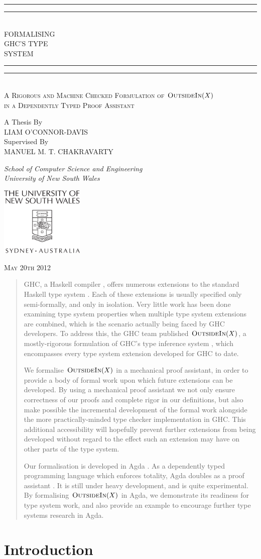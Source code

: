 \documentclass[a4paper]{jfp}
\newlength{\tpheight}\setlength{\tpheight}{0.9\textheight}
\newlength{\txtheight}\setlength{\txtheight}{0.9\tpheight}
\newlength{\tpwidth}\setlength{\tpwidth}{0.9\textwidth}
\newlength{\txtwidth}\setlength{\txtwidth}{0.9\tpwidth}
\newlength{\drop}
\newcommand{\outsidein}{\textsc{OutsideIn}(X)}
\newcommand*{\titleGP}{\begingroup%

\drop=0.1\txtheight
\centering
\vspace*{\baselineskip}
\rule{\txtwidth}{1.6pt}\vspace*{-\baselineskip}\vspace*{2pt}
\rule{\txtwidth}{0.4pt}\\[\baselineskip]
{\LARGE FORMALISING\\ GHC'S TYPE \\[0.3\baselineskip] SYSTEM}\\[0.2\baselineskip]
\rule{\txtwidth}{0.4pt}\vspace*{-\baselineskip}\vspace{3.2pt}
\rule{\txtwidth}{1.6pt}\\[\baselineskip]
\scshape
A Rigorous and Machine Checked Formulation of $\textsc{OutsideIn}(X)$ \\
in a Dependently Typed Proof Assistant \\
\par
\vspace*{2\baselineskip}
A Thesis By \\[\baselineskip]
{\Large LIAM O'CONNOR-DAVIS}
 \\[\baselineskip]
Supervised By \\[\baselineskip]
{\Large MANUEL M. T. CHAKRAVARTY}
 \\[\baselineskip]
{\itshape School of Computer Science and Engineering \\ University of New South Wales \par}
\vfill
\includegraphics[width=4cm]{unswcrest.pdf} \\

\medskip

{\scshape May 20th 2012} \\
\par
\endgroup}
\begin{document}
\setlength{\parskip}{9pt plus 1pt minus 1pt}
\pagestyle{empty}
\titleGP
\clearpage
\pagestyle{plain}
\begin{abstract}

GHC, a Haskell compiler \cite{Anonymous:2010we}, offers numerous extensions to the standard Haskell type system \cite{Schrijvers:2009jg,
   Yorgey:2012:GHP:2103786.2103795, citeulike:9320233, Jones:2007dr}.  Each of these extensions is usually specified only semi-formally, and only in
isolation. Very little work has been done examining type system properties when multiple type system extensions are combined, which is the scenario
actually being faced by GHC developers. To address this, the GHC team published $\outsidein$, a mostly-rigorous formulation of GHC's type inference
system \cite{Vytiniotis:2011:OMT:2139531.2139533}, which encompasses every type system extension developed for GHC to date. 

We formalise $\outsidein$ in a mechanical proof assistant, in order to provide a body of formal work upon which future extensions can be developed. By
using a mechanical proof assistant we not only ensure correctness of our proofs and complete rigor in our definitions, but also make possible the
incremental development of the formal work alongside the more practically-minded type checker implementation in GHC\@. This additional accessibility
will hopefully prevent further extensions from being developed without regard to the effect such an extension may have on other parts of the type
system.

Our formalisation is developed in Agda \cite{conf/afp/norell08}. As a dependently typed programming language which enforces totality, Agda doubles as
a proof assistant \cite{Howard:1980vs}. It is still under heavy development, and is quite experimental. By formalising $\outsidein$ in Agda, we
demonstrate its readiness for type system work, and also provide an example to encourage further type systems research in Agda.

\end{abstract}

\tableofcontents
\newpage

\section{Introduction}
\end{document}
